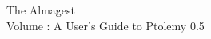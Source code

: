 

\begin{iftex}
\begin{titlepage}
\centering
\Huge
The Almagest \\
\comment {}
Volume \thevolume :  A User's Guide to Ptolemy 0.5
\end{titlepage}

\clearpage
\pagestyle{empty}
\vspace*{\fill}


\clearpage
\pagestyle{headings}
\tableofcontents
\listoffigures
\listoftables

\clearpage
\end{iftex}

